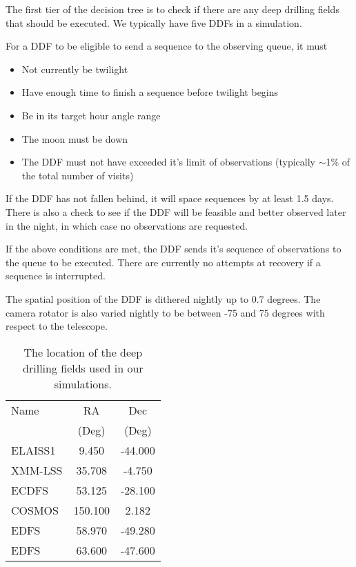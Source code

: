 The first tier of the decision tree is to check if there are any deep drilling fields that should be executed. We typically have five DDFs in a simulation. 

For a DDF to be eligible to send a sequence to the observing queue, it must
\begin{itemize}
\item{Not currently be twilight}
\item{Have enough time to finish a sequence before twilight begins}
\item{Be in its target hour angle range}
\item{The moon must be down}
\item{The DDF must not have exceeded it's limit of observations (typically $\sim$1\% of the total number of visits)}
\end{itemize}

If the DDF has not fallen behind, it will space sequences by at least 1.5 days. There is also a check to see if the DDF will be feasible and better observed later in the night, in which case no observations are requested.

If the above conditions are met, the DDF sends it's sequence of observations to the queue to be executed. There are currently no attempts at recovery if a sequence is interrupted. 

The spatial position of the DDF is dithered nightly up to 0.7 degrees.  The camera rotator is also varied nightly to be between -75 and 75 degrees with respect to the telescope. 

\begin{table}
\begin{centering}
\begin{tabular}{lcc}
\toprule
    Name &      RA &     Dec \\
    &          (Deg) &  (Deg) \\
    \hline
 ELAISS1 &   9.450 & -44.000 \\
 XMM-LSS &  35.708 &  -4.750 \\
   ECDFS &  53.125 & -28.100 \\
  COSMOS & 150.100 &   2.182 \\
    EDFS &  58.970 & -49.280 \\
    EDFS &  63.600 & -47.600 \\
    \hline
\end{tabular}
\caption{The location of the deep drilling fields used in our simulations.}\label{table:ddfs}
\end{centering}
\end{table}



